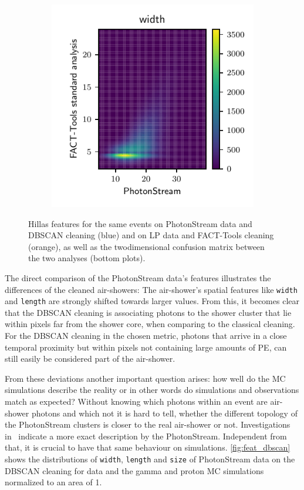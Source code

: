 \begin{figure}
\begin{subfigure}{0.5\textwidth}
  \end{subfigure}
  \begin{subfigure}{0.5\textwidth}
    \centering
    \includegraphics[width=\textwidth, page=2]{Plots/std_phs_comparison_DBSCAN_crab.pdf}
  \end{subfigure}
  \caption{Hillas features for the same events on PhotonStream data and DBSCAN cleaning (blue) and on LP data and FACT-Tools cleaning (orange), as well as the twodimensional confusion matrix between the two analyses (bottom plots).}
  \label{fig:feat_comp}
\end{figure}
%
The direct comparison of the PhotonStream data's features illustrates the
differences of the cleaned air-showers: The air-shower's spatial features like
\texttt{width} and \texttt{length} are strongly shifted towards larger values.
From this, it becomes clear that the DBSCAN cleaning is associating photons to
the shower cluster that lie within pixels far from the shower core, when
comparing to the classical cleaning. For the DBSCAN cleaning in the chosen
metric, photons that arrive in a close temporal proximity but within pixels not
containing large amounts of PE, can still easily be considered part of the
air-shower.

From these deviations another important question arises: how well do the MC
simulations describe the reality or in other words do simulations and observations
match as expected? Without knowing which photons within an event are air-shower
photons and which not it is hard to tell, whether the different topology of the
PhotonStream clusters is closer to the real air-shower or not.
Investigations in~\cite{sebastian} indicate a more exact description by the PhotonStream. Independent from that, it is crucial to
have that same behaviour on simulations. \autoref{fig:feat_dbscan} shows the
distributions of \texttt{width}, \texttt{length} and \texttt{size} of
PhotonStream data on the DBSCAN cleaning for data and the gamma and proton MC
simulations normalized to an area of \num{1}.

